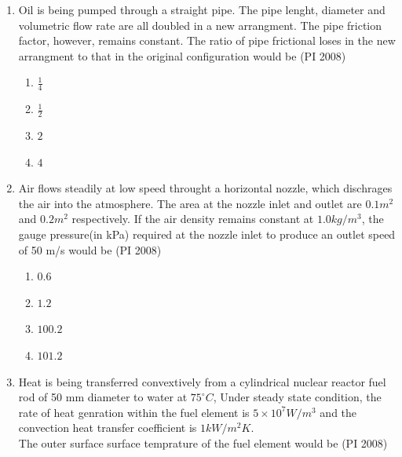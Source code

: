 \documentclass[journal,12pt,onecolumn]{IEEEtran}
\theoremstyle{remark}
\begin{document}
\begin{enumerate}
\begin{multicols}{4}
\begin{enumerate}
    \end{enumerate}
\end{multicols}
\vspace{1cm}
 \item %
 Oil is being pumped through a straight pipe. The pipe lenght, diameter and volumetric flow rate are all doubled in a new arrangment. The pipe friction factor, however, remains constant. The ratio of pipe frictional loses in the new arrangment to that in the original configuration would be   
    \hfill{(PI 2008)}
    \begin{multicols}{4}
    \begin{enumerate}
        \item $\frac{1}{4}$
        \item $\frac{1}{2}$
        \item $2$
        \item $4$
    \end{enumerate}
\end{multicols}
\vspace{1cm}
 \item %
 Air flows steadily at low speed throught a horizontal nozzle, which dischrages the air into the atmosphere. The area at the nozzle inlet and outlet are $0.1m^2$ and $0.2m^2$ respectively. If the air density remains constant at $1.0kg/m^3$, the gauge pressure(in kPa) required at the nozzle inlet to produce an outlet speed of 50 m/s would be  
    \hfill{(PI 2008)}
    \begin{multicols}{4}
    \begin{enumerate}
        \item $0.6$
        \item $1.2$
        \item $100.2$
        \item $101.2$
    \end{enumerate}
\end{multicols}
\vspace{1cm}
 \item %
 Heat is being transferred convextively from a cylindrical nuclear reactor fuel rod of 50 mm diameter to water at $75^{\circ}C$, Under steady state condition, the rate of heat genration within the fuel element is $5\times10^7W/m^3$ and the convection heat transfer coefficient is $1kW/m^2K$. \\
 The outer surface surface temprature of the fuel element would be
    \hfill{(PI 2008)}
    \begin{multicols}{4}
    \begin{enumerate}

\end{enumerate}
\end{multicols}
\end{enumerate}
\end{document}
